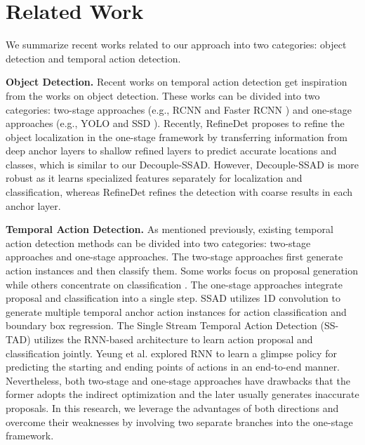 \documentclass{article}
\begin{document}
\section{Related Work}
We summarize recent works related to our approach into two categories: object detection and temporal action detection.

\textbf{Object Detection.}
Recent works on temporal action detection \cite{lin2017single,chao2018rethinking} get inspiration from the works on object detection.
These works can be divided into two categories: two-stage approaches (e.g., RCNN \cite{girshick2014rich} and Faster RCNN \cite{ren2015faster}) and one-stage approaches (e.g., YOLO \cite{redmon2016you} and SSD \cite{liu2016ssd}).
Recently, RefineDet \cite{zhang2018single} proposes to refine the object localization in the one-stage framework by transferring information from deep anchor layers to shallow refined layers to predict accurate locations and classes, which is similar to our Decouple-SSAD. However, Decouple-SSAD is more robust as it learns specialized features separately for localization and classification, whereas RefineDet refines the detection with coarse results in each anchor layer.


\textbf{Temporal Action Detection.}
As mentioned previously, existing temporal action detection methods can be divided into two categories: two-stage approaches and one-stage approaches. The two-stage approaches first generate action instances and then classify them. Some works focus on proposal generation \cite{escorcia2016daps,buch2017sst,Gao_2017_ICCV,lin2018bsn,gao2018ctap,AAAI1816109} while others concentrate on classification \cite{xu2017r,dai2017temporal,zhao2017temporal}.
The one-stage approaches integrate proposal and classification into a single step.
SSAD \cite{lin2017single} utilizes 1D convolution to generate multiple temporal anchor action instances for action classification and boundary box regression. The Single Stream Temporal Action Detection (SS-TAD) \cite{sstad_buch_bmvc17} utilizes the RNN-based architecture to learn action proposal and classification jointly.
Yeung et al. \cite{yeung2016end} explored RNN to learn a glimpse policy for predicting the starting and ending points of actions in an end-to-end manner.
Nevertheless, both two-stage and one-stage approaches have drawbacks that the former adopts the indirect optimization and the later usually generates inaccurate proposals.
In this research, we leverage the advantages of both directions and overcome their weaknesses by involving two separate branches into the one-stage framework.
\end{document}
